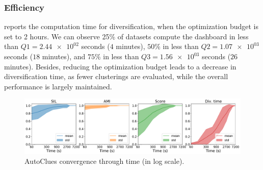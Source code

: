 \subsubsection{Efficiency}\label{sssec:efficiency}
 reports the computation time for diversification, when the optimization budget is set to 2 hours.
We can observe 25\% of datasets compute the dashboard in less than $Q1=\num{2.44e02}$ seconds ($4$ minutes), $50\%$ in less than $Q2=\num{1.07e03}$ seconds ($18$ minutes), and $75\%$ in less than $Q3=\num{1.56e03}$ seconds ($26$ minutes).
Besides, reducing the optimization budget leads to a decrease in diversification time, as fewer clusterings are evaluated, while the overall performance is largely maintained.

\begin{figure}[t]
    \centering
    \includegraphics[scale=.3]{chapters/data-centric/unsupervised/img/all.pdf}
    \caption{AutoClues convergence through time (in log scale).}
    \label{clustering-fig:convergence}
\end{figure}

